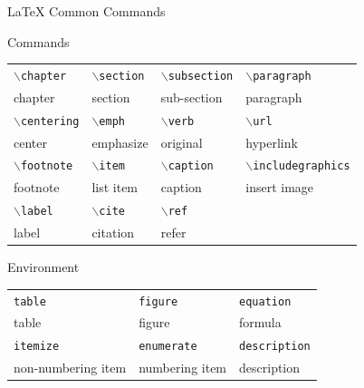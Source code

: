 \documentclass[serif, aspectratio=169]{beamer}
\def\cmd#1{\texttt{\color{red}\footnotesize $\backslash$#1}}
\def\env#1{\texttt{\color{blue}\footnotesize #1}}
\begin{document}
\begin{frame}[fragile]{\LaTeX{} Common Commands}
    \begin{exampleblock}{Commands}
        \centering
        \footnotesize
        \begin{tabular}{llll}
            \cmd{chapter} & \cmd{section} & \cmd{subsection} & \cmd{paragraph} \\
            chapter & section & sub-section & paragraph \\\hline
            \cmd{centering} & \cmd{emph} & \cmd{verb} & \cmd{url} \\
            center & emphasize & original & hyperlink \\\hline
            \cmd{footnote} & \cmd{item} & \cmd{caption} & \cmd{includegraphics} \\
            footnote & list item & caption & insert image \\\hline
            \cmd{label} & \cmd{cite} & \cmd{ref} \\
            label & citation & refer\\\hline
        \end{tabular}
    \end{exampleblock}
    \begin{exampleblock}{Environment}
        \centering
        \footnotesize
        \begin{tabular}{lll}
            \env{table} & \env{figure} & \env{equation}\\
            table & figure & formula \\\hline
            \env{itemize} & \env{enumerate} & \env{description}\\
            non-numbering item & numbering item & description \\\hline
        \end{tabular}
    \end{exampleblock}
\end{frame}
\end{document}
